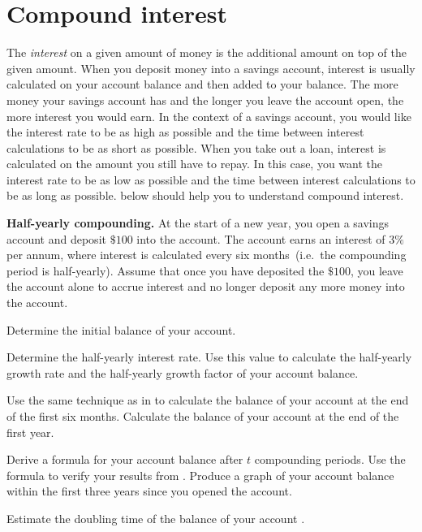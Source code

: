\documentclass[a4paper,oneside,12pt]{article}
\begin{document}

\section{Compound interest}

The \emph{interest} on a given amount of money is the additional
amount on top of the given amount.  When you deposit money into a
savings account, interest is usually calculated on your account
balance and then added to your balance.  The more money your savings
account has and the longer you leave the account open, the more
interest you would earn.  In the context of a savings account, you
would like the interest rate to be as high as possible and the time
between interest calculations to be as short as possible.  When you
take out a loan, interest is calculated on the amount you still have
to repay.  In this case, you want the interest rate to be as low as
possible and the time between interest calculations to be as long as
possible.   below should help you to
understand compound interest.

\begin{example}
\label{eg:savings_6months}
\textbf{Half-yearly compounding.}
At the start of a new year, you open a savings account and deposit
$\$100$ into the account.  The account earns an interest of $3\%$ per
annum, where interest is calculated every six months~(i.e.~the
compounding period is half-yearly).  Assume that once you have
deposited the $\$100$, you leave the account alone to accrue interest
and no longer deposit any more money into the account.
\begin{packedenum}
\item\label{subeg:savings_6months_initial_balance}
  Determine the initial balance of your account.

\item\label{subeg:savings_6months_growth_rate}
  Determine the half-yearly interest rate.  Use this value to
  calculate the half-yearly growth rate and the half-yearly growth
  factor of your account balance.

\item\label{subeg:savings_6months_balance_first_year}
  Use the same technique as in
   to calculate
  the balance of your account at the end of the first six months.
  Calculate the balance of your account at the end of the first year.

\item\label{subeg:savings_6months_balance_formula}
  Derive a formula for your account balance after $t$ compounding
  periods.  Use the formula to verify your results
  from .  Produce a
  graph of your account balance within the first three years since you
  opened the account.

\item\label{subeg:savings_6months_doubling_time}
  Estimate the doubling time of the balance of your account .
\end{packedenum}
\end{example}
\end{document}
